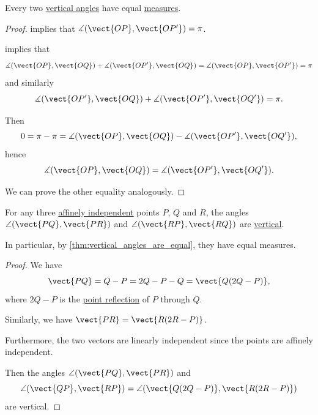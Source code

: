 \begin{proposition}\label{thm:vertical_angles_are_equal}
  Every two \hyperref[def:vertical_angles]{vertical angles} have equal \hyperref[def:angle/measure]{measures}.
\end{proposition}
\begin{proof}
   implies that \( \measuredangle(\vect{OP}, \vect{OP'}) = \pi \).

   implies that
  \begin{equation*}
    \measuredangle(\vect{OP}, \vect{OQ}) + \measuredangle(\vect{OP'}, \vect{OQ}) = \measuredangle(\vect{OP}, \vect{OP'}) = \pi
  \end{equation*}
  and similarly
  \begin{equation*}
    \measuredangle(\vect{OP'}, \vect{OQ}) + \measuredangle(\vect{OP'}, \vect{OQ'}) = \pi.
  \end{equation*}

  Then
  \begin{equation*}
    0 = \pi - \pi = \measuredangle(\vect{OP}, \vect{OQ}) - \measuredangle(\vect{OP'}, \vect{OQ'}),
  \end{equation*}
  hence
  \begin{equation*}
    \measuredangle(\vect{OP}, \vect{OQ}) = \measuredangle(\vect{OP'}, \vect{OQ'}).
  \end{equation*}

  We can prove the other equality analogously.
\end{proof}

\begin{proposition}\label{thm:angle_with_inverse_vectors}
  For any three \hyperref[def:affine_dependence]{affinely independent} points \( P \), \( Q \) and \( R \), the angles \( \angle(\vect{PQ}, \vect{PR}) \) and \( \angle(\vect{RP}, \vect{RQ}) \) are \hyperref[def:vertical_angles]{vertical}.
\end{proposition}
\begin{comments}
  \item In particular, by \cref{thm:vertical_angles_are_equal}, they have equal measures.
\end{comments}
\begin{proof}
  We have
  \begin{equation*}
    \vect{PQ} = Q - P = 2Q - P - Q = \vect{Q(2Q - P)},
  \end{equation*}
  where \( 2Q - P \) is the \hyperref[def:rigid_motion/point_reflection]{point reflection} of \( P \) through \( Q \).

  Similarly, we have \( \vect{PR} = \vect{R(2R - P)} \).

  Furthermore, the two vectors are linearly independent since the points are affinely independent.

  Then the angles \( \angle(\vect{PQ}, \vect{PR}) \) and
  \begin{equation*}
    \angle(\vect{QP}, \vect{RP}) = \angle(\vect{Q(2Q - P)}, \vect{R(2R - P)})
  \end{equation*}
  are vertical.
\end{proof}

